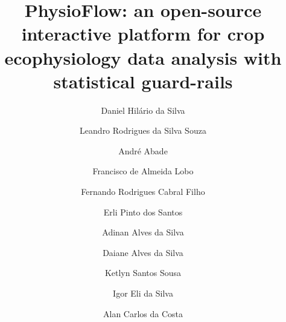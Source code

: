\documentclass[preprint,12pt,a4paper]{elsarticle}
\begin{document}
\renewcommand{\labelenumii}{\arabic{enumi}.\arabic{enumii}}

\begin{frontmatter}

\title{PhysioFlow: an open-source interactive platform for crop ecophysiology data analysis with statistical guard-rails}

\author[ifcat]{Daniel Hil\'ario da Silva}

\author[ceagre,ifgr]{Leandro Rodrigues da Silva Souza}

\author[ifmt]{Andr\'e Abade}

\author[ufmt]{Francisco de Almeida Lobo}

\author[ceagre,ifgr]{Fernando Rodrigues Cabral Filho}

\author[ufrrj]{Erli Pinto dos Santos}

\author[ifgr]{Adinan Alves da Silva}

\author[ceagre]{Daiane Alves da Silva}

\author[ifgr]{Ketlyn Santos Sousa}

\author[ifgr]{Igor Eli da Silva}

\author[ifgr]{Alan Carlos da Costa}

\address[ifcat]{Instituto Federal Goiano, Campus Catal\~ao, Goi\'as, Brazil}
\address[ceagre]{Center of Excellence in Exponential Agriculture (CEAGRE), Goi\'as, Brazil}
\address[ifgr]{Instituto Federal Goiano, Campus Rio Verde, Goi\'as, Brazil}
\address[ifmt]{Instituto Federal de Mato Grosso, Cuiab\'a, Mato Grosso, Brazil}
\address[ufmt]{Universidade Federal de Mato Grosso, Mato Grosso, Brazil}
\address[ufrrj]{Universidade Federal Rural do Rio de Janeiro, Serop\'edica, Rio de Janeiro, Brazil}



\end{frontmatter}
\end{document}
